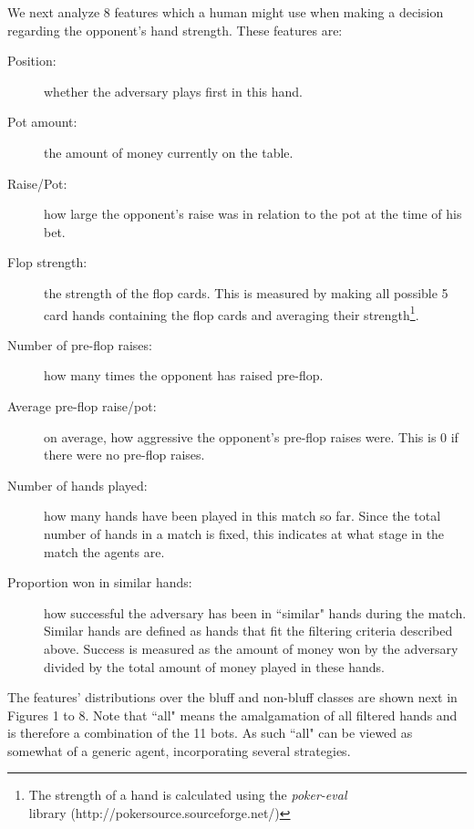 \documentclass[letterpaper]{article}
\begin{document}
We next analyze 8 features which a human might use when making a decision regarding the opponent's hand strength. These features are:

\begin{description}
  \item[Position:] whether the adversary plays first in this hand.
  \item[Pot amount:] the amount of money currently on the table.
  \item[Raise/Pot:] how large the opponent's raise was in relation to the pot at the time of his bet.
  \item[Flop strength:] the strength of the flop cards. This is measured by making all possible 5 card hands containing the flop cards and averaging their strength\footnote{The strength of a hand is calculated using the \emph{poker-eval}\\ library (http://pokersource.sourceforge.net/)}.
  \item[Number of pre-flop raises:] how many times the opponent has raised pre-flop.
  \item[Average pre-flop raise/pot:] on average, how aggressive the opponent's pre-flop raises were. This is 0 if there were no pre-flop raises.
  \item[Number of hands played:] how many hands have been played in this match so far. Since the total number of hands in a match is fixed, this indicates at what stage in the match the agents are.
  \item[Proportion won in similar hands:] how successful the adversary has been in ``similar" hands during the match. Similar hands are defined as hands that fit the filtering criteria described above. Success is measured as the amount of money won by the adversary divided by the total amount of money played in these hands. 
\end{description}

The features' distributions over the bluff and non-bluff classes are shown next in Figures 1 to 8. Note that ``all" means the amalgamation of all filtered hands and is therefore a combination of the 11 bots. As such ``all" can be viewed as somewhat of a generic agent, incorporating several strategies.
\end{document}
